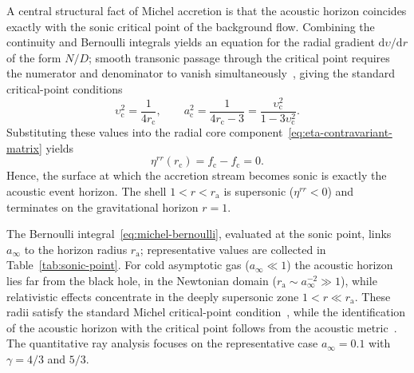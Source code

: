 \documentclass[12pt,a4paper,preprint]{elsarticle}
\begin{document}
            A central structural fact of Michel accretion is that the acoustic horizon coincides exactly with the sonic critical point of the background flow. Combining the continuity and Bernoulli integrals yields an equation for the radial gradient $\mathrm{d}\upsilon/\mathrm{d}r$ of the form $N/D$; smooth transonic passage through the critical point requires the numerator and denominator to vanish simultaneously~\cite{ShapiroSL_TeukolskySA_BlackHolesWhiteDwarfsAndNeutronStarsThePhysicsOfCompactObjects_2004}, giving the standard critical-point conditions
            \begin{equation}
                \upsilon^{2}_{\mathrm{c}} = \frac{1}{4r_{\mathrm{c}}} , \qquad a^{2}_{\mathrm{c}} = \frac{1}{4r_{\mathrm{c}}-3} = \frac{\upsilon^{2}_{\mathrm{c}}}{1-3\upsilon^{2}_{\mathrm{c}}} .
                \label{eq:michel-sonic}
            \end{equation}
            Substituting these values into the radial core component~\eqref{eq:eta-contravariant-matrix} yields
            \begin{equation}
                \eta^{rr}(r_{\mathrm{c}}) = f_{\mathrm{c}} - f_{\mathrm{c}} = 0 .
                \label{eq:sonic-is-horizon}
            \end{equation}
            Hence, the surface at which the accretion stream becomes sonic is exactly the acoustic event horizon. The shell $1<r<r_{\mathrm{a}}$ is supersonic ($\eta^{rr}<0$) and terminates on the gravitational horizon $r=1$.

            The Bernoulli integral~\eqref{eq:michel-bernoulli}, evaluated at the sonic point, links $a_{\infty}$ to the horizon radius $r_{\mathrm{a}}$; representative values are collected in Table~\ref{tab:sonic-point}. For cold asymptotic gas ($a_{\infty}\ll 1$) the acoustic horizon lies far from the black hole, in the Newtonian domain ($r_{\mathrm{a}}\sim a^{-2}_{\infty}\gg 1$), while relativistic effects concentrate in the deeply supersonic zone $1<r\ll r_{\mathrm{a}}$. These radii satisfy the standard Michel critical-point condition~\cite{MichelFC_AccretionOfMatterByCondensedObjects_1972, ShapiroSL_TeukolskySA_BlackHolesWhiteDwarfsAndNeutronStarsThePhysicsOfCompactObjects_2004}, while the identification of the acoustic horizon with the critical point follows from the acoustic metric~\cite{MoncriefV_StabilityOfStationarySphericalAccretionOntoASchwarzschildBlackHole_1980, BilicN_RelativisticAcousticGeometry_1999}. The quantitative ray analysis focuses on the representative case $a_{\infty}=0.1$ with $\gamma=4/3$ and $5/3$.
\end{document}

